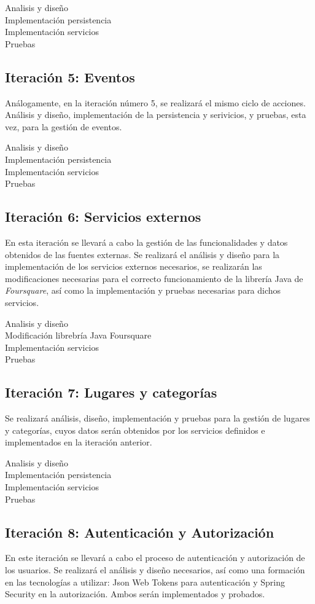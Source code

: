 Analisis y diseño\\
Implementación persistencia\\
Implementación servicios\\
Pruebas

\subsection{Iteración 5: Eventos}
Análogamente, en la iteración número 5, se realizará el mismo ciclo de acciones. Análisis y diseño, implementación de la persistencia y serivicios, y pruebas, esta vez, para la gestión de eventos.

Analisis y diseño\\
Implementación persistencia\\
Implementación servicios\\
Pruebas

\subsection{Iteración 6: Servicios externos}
En esta iteración se llevará a cabo la gestión de las funcionalidades y datos obtenidos de las fuentes externas. Se realizará el análisis y diseño para la implementación de los servicios externos necesarios, se realizarán las modificaciones necesarias para el correcto funcionamiento de la librería Java de \textit{Foursquare}, así como la implementación y pruebas necesarias para dichos servicios.

Analisis y diseño\\
Modificación librebría Java Foursquare\\
Implementación servicios\\
Pruebas

\subsection{Iteración 7: Lugares y categorías}
Se realizará análisis, diseño, implementación y pruebas para la gestión de lugares y categorías, cuyos datos serán obtenidos por los servicios definidos e implementados en la iteración anterior.

Analisis y diseño\\
Implementación persistencia\\
Implementación servicios\\
Pruebas

\subsection{Iteración 8: Autenticación y Autorización}
En este iteración se llevará a cabo el proceso de autenticación y autorización de los usuarios. Se realizará el análisis y diseño necesarios, así como una formación en las tecnologías a utilizar: Json Web Tokens para autenticación y Spring Security en la autorización. Ambos serán implementados y probados.

